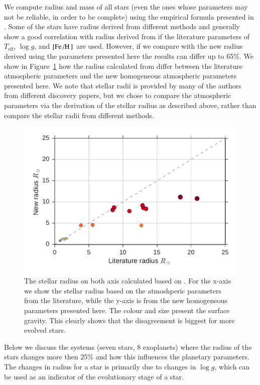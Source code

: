 \documentclass{aa}
\begin{document}
We compute radius and mass of all stars (even the ones whose parameters may not
be reliable, in order to be complete) using the empirical formula presented in
\citet{Torres2010}. Some of the stars have radius derived from different methods
and generally show a good correlation with radius derived from
\citet{Torres2010} if the literature parameters of $T_\mathrm{eff}$, $\log g$,
and $[\ion{Fe}/\ion{H}]$ are used. However, if we compare with the new radius
derived using the parameters presented here the results can differ up to 65\%.
We show in Figure~\ref{fig:RR} how the radius calculated from \citet{Torres2010}
differ between the literature atmospheric parameters and the new homogeneous
atmospheric parameters presented here. We note that stellar radii is provided by
many of the authors from different discovery papers, but we chose to compare the
atmospheric parameters via the derivation of the stellar radius as described
above, rather than compare the stellar radii from different methods.

\begin{figure}[tpb]
    \centering
    \includegraphics[width=1.0\linewidth]{figures/radiusVSradius.pdf}
    \caption{The stellar radius on both axis calculated based on \citet{Torres2010}.
    For the x-axis we show the stellar radius based on the atmoshperic parameters
    from the literature, while the y-axis is from the new homogeneous parameters
    presented here. The colour and size present the surface gravity. This clearly
    shows that the disagreement is biggest for more evolved stars.}
    \label{fig:RR}
\end{figure}

Below we discuss the systems (seven stars, 8 exoplanets) where the radius of the
stars changes more then 25\% and how this influences the planetary parameters.
The changes in radius for a star is primarily due to changes in $\log g$, which
can be used as an indicator of the evolutionary stage of a star.
\end{document}
